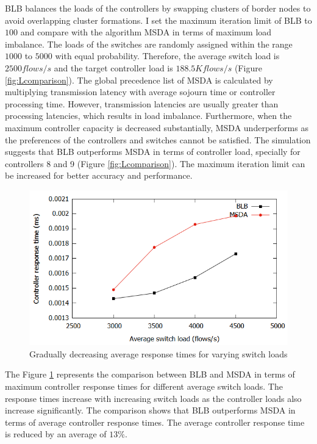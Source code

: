 \documentclass[journal]{IEEEtran}
\begin{document}
BLB balances the loads of the controllers by swapping clusters of border nodes to avoid overlapping cluster formations. I set the maximum iteration limit of BLB to $100$ and compare with the algorithm MSDA \cite{filali2018sdn, fragiadakis2016strategyproof} in terms of maximum load imbalance. The loads of the switches are randomly assigned within the range $1000$ to $5000$ with equal probability. Therefore, the average switch load is $2500 flows/s$ and the target controller load is $188.5K flows/s$ (Figure \ref{fig:Lcomparison}). The global precedence list of MSDA is calculated by multiplying transmission latency with average sojourn time or controller processing time. However, transmission latencies are usually greater than processing latencies, which results in load imbalance. Furthermore, when the maximum controller capacity is decreased substantially, MSDA underperforms as the preferences of the controllers and switches cannot be satisfied. The simulation suggests that BLB outperforms MSDA in terms of controller load, specially for controllers 8 and 9 (Figure \ref{fig:Lcomparison}). The maximum iteration limit can be increased for better accuracy and performance.

\begin{figure}
	\centering
	\includegraphics[width=\linewidth]{Images/response_comparison.png}
	\caption{Gradually decreasing average response times for varying switch loads} \label{fig:Rcomparison}
\end{figure}


The Figure \ref{fig:Rcomparison} represents the comparison between BLB and MSDA in terms of maximum controller response times for different average switch loads. The response times increase with increasing switch loads as the controller loads also increase significantly. The comparison shows that BLB outperforms MSDA in terms of average controller response times. The average controller response time is reduced by an average of $13\%$.
\end{document}
